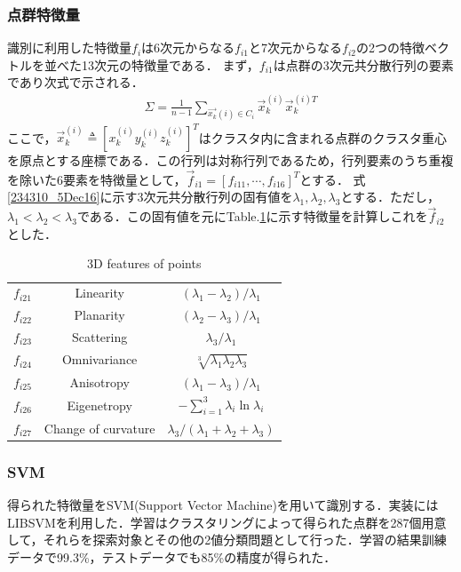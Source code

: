 \documentclass[10pt,a4paper]{jarticle}
\begin{document}
\subsubsection{点群特徴量}
識別に利用した特徴量$f_{i}$は6次元からなる$f_{i1}$と7次元からなる$f_{i2}$の2つの特徴ベクトルを並べた13次元の特徴量である．
まず，$f_{i1}$は点群の3次元共分散行列の要素であり次式で示される．
\begin{eqnarray}
 \Sigma = \frac{1}{n-1}\sum_{\vec{x_{k}}(i)\in C_{i}}\vec{x}_{k}^{(i)}\vec{x}_{k}^{(i)T}\label{234310_5Dec16}
\end{eqnarray}
ここで，$\vec{x}_{k}^{(i)}\triangleq[x_{k}^{(i)} y_{k}^{(i)} z_{k}^{(i)}]^{T}$はクラスタ内に含まれる点群のクラスタ重心を原点とする座標である．この行列は対称行列であるため，行列要素のうち重複を除いた6要素を特徴量として，$\vec{f}_{i1} = [f_{i11}, \cdots, f_{i16}]^{T}$とする．
式\eqref{234310_5Dec16}に示す3次元共分散行列の固有値を$\lambda_{1}, \lambda_{2}, \lambda_{3}$とする．ただし，$\lambda_{1} < \lambda_{2} < \lambda_{3}$である．この固有値を元にTable.\ref{222525_5Dec16}に示す特徴量を計算しこれを$\vec{f}_{i2}$とした．
\begin{table}
 \centering
 \caption{3D features of points}
 \label{222525_5Dec16}
 \begin{tabular}{|c|c|c|}
  \hline
  $f_{i21}$ & Linearity & $(\lambda_{1}-\lambda_{2})/\lambda_{1}$ \\
  $f_{i22}$ & Planarity & $(\lambda_{2}-\lambda_{3})/\lambda_{1}$ \\
  $f_{i23}$ & Scattering & $\lambda_{3}/\lambda_{1}$ \\
  $f_{i24}$ & Omnivariance & $\sqrt[3]{\lambda_{1}\lambda_{2}\lambda_{3}}$ \\
  $f_{i25}$ & Anisotropy & $(\lambda_{1}-\lambda_{3})/\lambda_{1}$ \\
  $f_{i26}$ & Eigenetropy & $-\sum^{3}_{i=1}\lambda_{i}\ln\lambda_{i}$ \\
  $f_{i27}$ & Change of curvature & $\lambda_{3}/(\lambda_{1}+\lambda_{2}+\lambda_{3})$ \\
  \hline
 \end{tabular}
\end{table}

\subsubsection{SVM}
得られた特徴量をSVM(Support Vector Machine)を用いて識別する．実装にはLIBSVMを利用した．学習はクラスタリングによって得られた点群を287個用意して，それらを探索対象とその他の2値分類問題として行った．学習の結果訓練データで99.3\%，テストデータでも85\%の精度が得られた．
\end{document}
